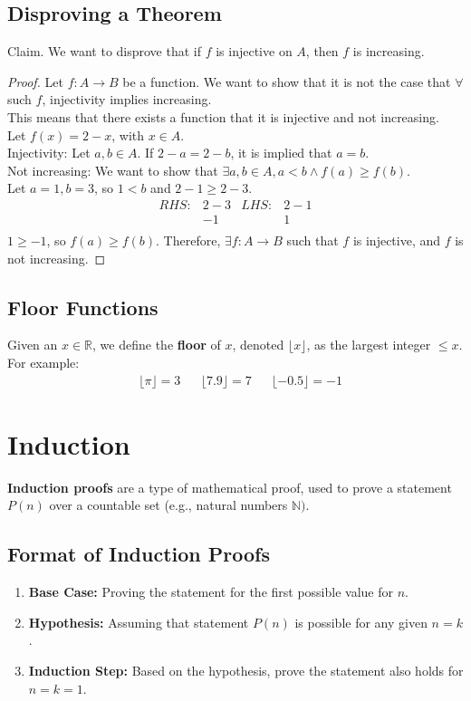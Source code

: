 \documentclass{article}
\begin{document}
\subsection{Disproving a Theorem}
Claim. We want to disprove that if $f$ is injective on $A$, then $f$ is increasing.
\begin{proof}
Let $f: A \rightarrow B$ be a function. We want to show that it is not the case that $\forall$ such $f$, injectivity implies increasing.\\
This means that there exists a function that it is injective and not increasing.\\
Let $f(x) = 2 - x$, with $x \in A$.\\
Injectivity: Let $a, b \in A$. If $2 - a = 2 - b$, it is implied that $a = b$.\\
Not increasing: We want to show that $\exists a, b \in A, a < b \land f(a) \geq f(b)$.\\
Let $a = 1, b = 3$, so $1 < b$ and $2 - 1 \geq 2 - 3$.
\begin{align*}
    RHS: & 2 - 3 & LHS: & 2 - 1\\
    & -1 & & 1\\
\end{align*}
$1 \geq -1$, so $f(a) \geq f(b)$. Therefore, $\exists f: A \rightarrow B$ such that $f$ is injective, and $f$ is not increasing.
\end{proof}
\subsection{Floor Functions}
Given an $x \in \mathbb{R}$, we define the \textbf{floor} of $x$, denoted $\lfloor x \rfloor$, as the largest integer $\leq x$. For example:
\begin{align*}
    & \lfloor \pi \rfloor = 3 & &  \lfloor 7.9 \rfloor = 7 & & \lfloor -0.5 \rfloor = -1
\end{align*}
\section{Induction}
\textbf{Induction proofs} are a type of mathematical proof, used to prove a statement $P(n)$ over a countable set (e.g., natural numbers $\mathbb{N})$.
\subsection{Format of Induction Proofs}
\begin{enumerate}
    \item \textbf{Base Case: }Proving the statement for the first possible value for $n$.
    \item \textbf{Hypothesis: }Assuming that statement $P(n)$ is possible for any given $n = k$.
    \item \textbf{Induction Step: }Based on the hypothesis, prove the statement also holds for $n = k = 1$.
\end{enumerate}
\end{document}
